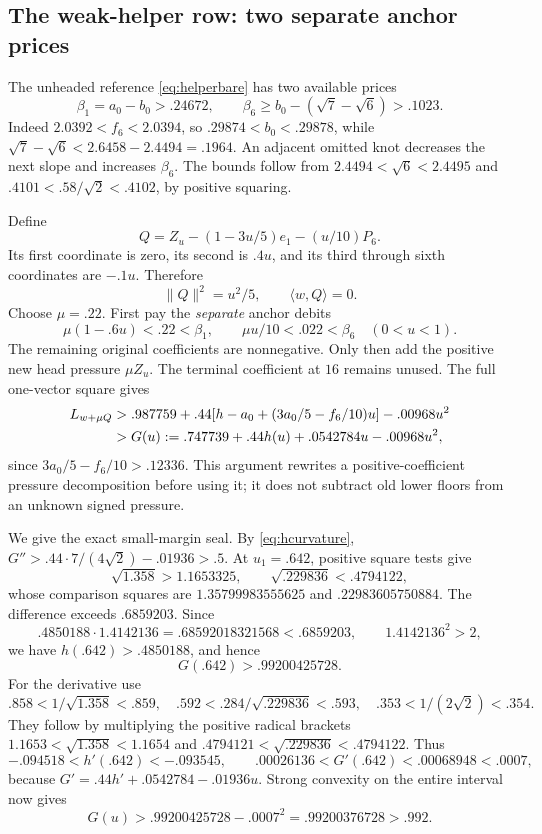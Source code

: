 \documentclass[11pt]{article}
\theoremstyle{definition}
\theoremstyle{remark}
\newcommand{\ip}[2]{\langle #1,#2\rangle}
\newcommand{\norm}[1]{\lVert #1\rVert}
\begin{document}
\subsection{The weak-helper row: two separate anchor prices}
\label{subsec:helperfunding}
The unheaded reference \eqref{eq:helperbare} has two available
prices
\begin{equation}
\label{eq:twoprices}
 \beta_1=a_0-b_0>.24672,\qquad
 \beta_6\geq b_0-(\sqrt7-\sqrt6)>.1023.
\end{equation}
Indeed \(2.0392<f_6<2.0394\), so
\(.29874<b_0<.29878\), while
\(\sqrt7-\sqrt6<2.6458-2.4494=.1964\).
An adjacent omitted knot decreases the next slope and increases
\(\beta_6\). The bounds follow from
\(2.4494<\sqrt6<2.4495\) and
\(.4101<.58/\sqrt2<.4102\), by positive squaring.

Define
\[
 Q=Z_u-(1-3u/5)e_1-(u/10)P_6.
\]
Its first coordinate is zero, its second is \(.4u\), and its
third through sixth coordinates are \(-.1u\). Therefore
\begin{equation}
\label{eq:helperresidual}
 \norm{Q}^2=u^2/5,\qquad \ip{w}{Q}=0.
\end{equation}
Choose \(\mu=.22\). First pay the \emph{separate} anchor debits
\[
 \mu(1-.6u)<.22<\beta_1,\qquad
 \mu u/10<.022<\beta_6
 \quad(0<u<1).
\]
The remaining original coefficients are nonnegative. Only then
add the positive new head pressure \(\mu Z_u\).
The terminal coefficient at \(16\) remains unused. The full
one-vector square gives
\begin{align}
\label{eq:Gdefinition}
 L_{w+\mu Q}
 &>.987759+.44[h-a_0+(3a_0/5-f_6/10)u]-.00968u^2\notag\\
 &>G(u):=.747739+.44h(u)+.0542784u-.00968u^2,
\end{align}
since \(3a_0/5-f_6/10>.12336\).
This argument rewrites a positive-coefficient pressure
decomposition before using it; it does not subtract old lower
floors from an unknown signed pressure.

We give the exact small-margin seal. By \eqref{eq:hcurvature},
\(G''>.44\cdot7/(4\sqrt2)-.01936>.5\).
At \(u_1=.642\), positive square tests give
\[
 \sqrt{1.358}>1.1653325,\qquad
 \sqrt{.229836}<.4794122,
\]
whose comparison squares are \(1.35799983555625\) and
\(.22983605750884\). The difference exceeds \(.6859203\).
Since
\[
 .4850188\cdot1.4142136=.68592018321568<.6859203,
 \qquad1.4142136^2>2,
\]
we have \(h(.642)>.4850188\), and hence
\[
 G(.642)>.99200425728.
\]
For the derivative use
\[
 .858<1/\sqrt{1.358}<.859,\quad
 .592<.284/\sqrt{.229836}<.593,\quad
 .353<1/(2\sqrt2)<.354.
\]
They follow by multiplying the positive radical brackets
\(1.1653<\sqrt{1.358}<1.1654\) and
\(.4794121<\sqrt{.229836}<.4794122\).
Thus
\[
 -.094518<h'(.642)<-.093545,\qquad
 .00026136<G'(.642)<.00068948<.0007,
\]
because \(G'=.44h'+.0542784-.01936u\).
Strong convexity on the entire interval now gives
\begin{equation}
\label{eq:Gseal}
 G(u)>.99200425728-.0007^2
       =.99200376728>.992.
\end{equation}
\end{document}

